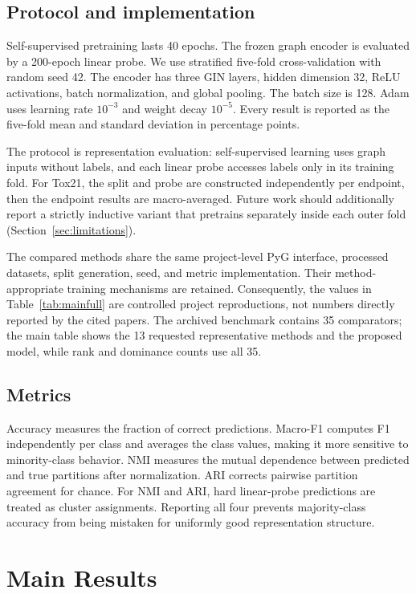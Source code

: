 \documentclass[10pt,twocolumn]{article}
\begin{document}
\subsection{Protocol and implementation}

Self-supervised pretraining lasts 40 epochs. The frozen graph encoder is evaluated by a 200-epoch linear probe. We use stratified five-fold cross-validation with random seed 42. The encoder has three GIN layers, hidden dimension 32, ReLU activations, batch normalization, and global pooling. The batch size is 128. Adam uses learning rate $10^{-3}$ and weight decay $10^{-5}$. Every result is reported as the five-fold mean and standard deviation in percentage points.

The protocol is representation evaluation: self-supervised learning uses graph inputs without labels, and each linear probe accesses labels only in its training fold. For Tox21, the split and probe are constructed independently per endpoint, then the endpoint results are macro-averaged. Future work should additionally report a strictly inductive variant that pretrains separately inside each outer fold (Section~\ref{sec:limitations}).

The compared methods share the same project-level PyG interface, processed datasets, split generation, seed, and metric implementation. Their method-appropriate training mechanisms are retained. Consequently, the values in Table~\ref{tab:mainfull} are controlled project reproductions, not numbers directly reported by the cited papers. The archived benchmark contains 35 comparators; the main table shows the 13 requested representative methods and the proposed model, while rank and dominance counts use all 35.

\subsection{Metrics}

Accuracy measures the fraction of correct predictions. Macro-F1 computes F1 independently per class and averages the class values, making it more sensitive to minority-class behavior. NMI measures the mutual dependence between predicted and true partitions after normalization. ARI corrects pairwise partition agreement for chance. For NMI and ARI, hard linear-probe predictions are treated as cluster assignments. Reporting all four prevents majority-class accuracy from being mistaken for uniformly good representation structure.

\section{Main Results}
\end{document}
